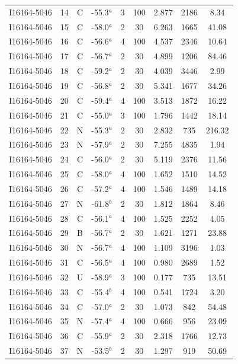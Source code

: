 \begin{table}
\begin{tabular}{ccccccccc}
I16164-5046 & 14 & C & -55.3$^{a}$ & 3 & 100 & 2.877 & 2186 & 8.34 \\
I16164-5046 & 15 & C & -58.0$^{a}$ & 2 & 30 & 6.263 & 1665 & 41.08 \\
I16164-5046 & 16 & C & -56.6$^{a}$ & 4 & 100 & 4.537 & 2346 & 10.64 \\
I16164-5046 & 17 & C & -56.7$^{a}$ & 2 & 30 & 4.899 & 1206 & 84.46 \\
I16164-5046 & 18 & C & -59.2$^{a}$ & 2 & 30 & 4.039 & 3446 & 2.99 \\
I16164-5046 & 19 & C & -56.8$^{a}$ & 2 & 30 & 5.341 & 1677 & 34.26 \\
I16164-5046 & 20 & C & -59.4$^{a}$ & 4 & 100 & 3.513 & 1872 & 16.22 \\
I16164-5046 & 21 & C & -55.0$^{a}$ & 3 & 100 & 1.796 & 1442 & 18.14 \\
I16164-5046 & 22 & N & -55.3$^{a}$ & 2 & 30 & 2.832 & 735 & 216.32 \\
I16164-5046 & 23 & N & -57.9$^{a}$ & 2 & 30 & 7.255 & 4835 & 1.94 \\
I16164-5046 & 24 & C & -56.0$^{a}$ & 2 & 30 & 5.119 & 2376 & 11.56 \\
I16164-5046 & 25 & C & -58.0$^{a}$ & 4 & 100 & 1.652 & 1510 & 14.52 \\
I16164-5046 & 26 & C & -57.2$^{a}$ & 4 & 100 & 1.546 & 1489 & 14.18 \\
I16164-5046 & 27 & N & -61.8$^{b}$ & 2 & 30 & 1.812 & 1864 & 8.46 \\
I16164-5046 & 28 & C & -56.1$^{a}$ & 4 & 100 & 1.525 & 2252 & 4.05 \\
I16164-5046 & 29 & B & -56.7$^{a}$ & 2 & 30 & 1.621 & 1271 & 23.88 \\
I16164-5046 & 30 & N & -56.7$^{a}$ & 4 & 100 & 1.109 & 3196 & 1.03 \\
I16164-5046 & 31 & C & -56.5$^{a}$ & 4 & 100 & 0.980 & 2689 & 1.52 \\
I16164-5046 & 32 & U & -58.9$^{a}$ & 3 & 100 & 0.177 & 735 & 13.51 \\
I16164-5046 & 33 & C & -55.4$^{b}$ & 4 & 100 & 0.541 & 1724 & 3.20 \\
I16164-5046 & 34 & C & -57.0$^{a}$ & 2 & 30 & 1.073 & 842 & 54.48 \\
I16164-5046 & 35 & N & -57.4$^{a}$ & 4 & 100 & 0.666 & 956 & 23.09 \\
I16164-5046 & 36 & C & -55.9$^{a}$ & 2 & 30 & 2.318 & 1766 & 12.73 \\
I16164-5046 & 37 & N & -53.5$^{b}$ & 2 & 30 & 1.297 & 919 & 50.69 \\

\end{tabular}
\end{table}
